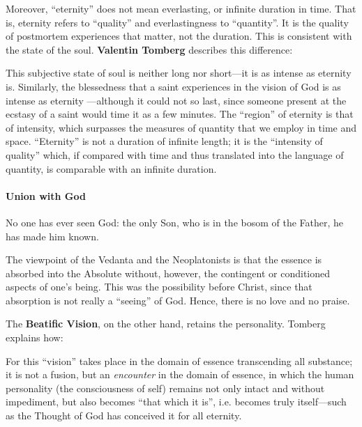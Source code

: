 Moreover, ``eternity'' does not mean everlasting, or infinite duration in time. That is, eternity refers to ``quality'' and everlastingness to ``quantity''. It is the quality of postmortem experiences that matter, not the duration. This is consistent with the state of the soul.
\textbf{Valentin Tomberg} describes this difference:


\begin{quotex}
This subjective state of soul is neither long nor short---it is as intense as eternity is. Similarly, the blessedness that a saint experiences in the vision of God is as intense as eternity ---although it could not so last, since someone present at the ecstasy of a saint would time it as a few minutes. The ``region'' of eternity is that of intensity, which surpasses the measures of quantity that we employ in time and space. ``Eternity'' is not a duration of infinite length; it is the ``intensity of quality'' which, if compared with time and thus translated into the language of quantity, is comparable with an infinite duration.
\end{quotex}


\paragraph{Union with God}


\begin{quotex}
No one has ever seen God: the only Son, who is in the bosom of the Father, he has made him known.
\end{quotex}


The viewpoint of the Vedanta and the Neoplatonists is that the essence is absorbed into the Absolute without, however, the contingent or conditioned aspects of one's being. This was the possibility before Christ, since that absorption is not really a ``seeing'' of God. Hence, there is no love and no praise.

The \textbf{Beatific Vision}, on the other hand, retains the personality. Tomberg explains how:

\begin{quotex}
For this ``vision'' takes place in the domain of essence transcending all substance; it is not a fusion, but an \emph{encounter} in the domain of essence, in which the human personality (the consciousness of self) remains not only intact and without impediment, but also becomes ``that which it is'', i.e. becomes truly itself---such as the Thought of God has conceived it for all eternity.
\end{quotex}


